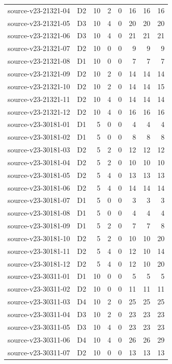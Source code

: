 \begin{longtable}{p{}lrrrrrr}
source-v23-21321-04 & D2 & 10 & 2 & 0 & 16 & 16 & 16\\
source-v23-21321-05 & D3 & 10 & 4 & 0 & 20 & 20 & 20\\
source-v23-21321-06 & D3 & 10 & 4 & 0 & 21 & 21 & 21\\
source-v23-21321-07 & D2 & 10 & 0 & 0 & 9 & 9 & 9\\
source-v23-21321-08 & D1 & 10 & 0 & 0 & 7 & 7 & 7\\
source-v23-21321-09 & D2 & 10 & 2 & 0 & 14 & 14 & 14\\
source-v23-21321-10 & D2 & 10 & 2 & 0 & 14 & 14 & 15\\
source-v23-21321-11 & D2 & 10 & 4 & 0 & 14 & 14 & 14\\
source-v23-21321-12 & D2 & 10 & 4 & 0 & 16 & 16 & 16\\
source-v23-30181-01 & D1 & 5 & 0 & 0 & 4 & 4 & 4\\
source-v23-30181-02 & D1 & 5 & 0 & 0 & 8 & 8 & 8\\
source-v23-30181-03 & D2 & 5 & 2 & 0 & 12 & 12 & 12\\
source-v23-30181-04 & D2 & 5 & 2 & 0 & 10 & 10 & 10\\
source-v23-30181-05 & D2 & 5 & 4 & 0 & 13 & 13 & 13\\
source-v23-30181-06 & D2 & 5 & 4 & 0 & 14 & 14 & 14\\
source-v23-30181-07 & D1 & 5 & 0 & 0 & 3 & 3 & 3\\
source-v23-30181-08 & D1 & 5 & 0 & 0 & 4 & 4 & 4\\
source-v23-30181-09 & D1 & 5 & 2 & 0 & 7 & 7 & 8\\
source-v23-30181-10 & D2 & 5 & 2 & 0 & 10 & 10 & 20\\
source-v23-30181-11 & D2 & 5 & 4 & 0 & 12 & 10 & 14\\
source-v23-30181-12 & D2 & 5 & 4 & 0 & 12 & 10 & 20\\
source-v23-30311-01 & D1 & 10 & 0 & 0 & 5 & 5 & 5\\
source-v23-30311-02 & D2 & 10 & 0 & 0 & 11 & 11 & 11\\
source-v23-30311-03 & D4 & 10 & 2 & 0 & 25 & 25 & 25\\
source-v23-30311-04 & D3 & 10 & 2 & 0 & 23 & 23 & 23\\
source-v23-30311-05 & D3 & 10 & 4 & 0 & 23 & 23 & 23\\
source-v23-30311-06 & D4 & 10 & 4 & 0 & 26 & 26 & 29\\
source-v23-30311-07 & D2 & 10 & 0 & 0 & 13 & 13 & 13\\

\end{longtable}
